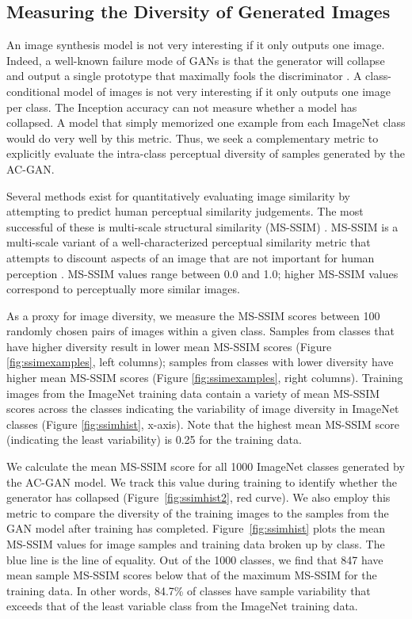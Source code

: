 \documentclass{article}
\begin{document}
\subsection{Measuring the Diversity of Generated Images} \label{section:diversity}

An image synthesis model is not very interesting if it only outputs one image.
Indeed, a well-known failure mode of GANs is that the generator will collapse and
output a single prototype that maximally fools the discriminator \citep{GANS, IMPROVEDTECHNIQUES}.
A class-conditional model of images is not very interesting if it only
outputs one image per class.
The Inception accuracy can not measure whether a model has collapsed.
A model that simply memorized one example from each
ImageNet class would do very well by this metric.
Thus, we seek a complementary metric to explicitly evaluate the intra-class perceptual
diversity of samples generated by the AC-GAN.

Several methods exist for quantitatively evaluating image similarity
by attempting to predict human perceptual similarity judgements.
The most successful 
of these is multi-scale structural similarity (MS-SSIM) \citep{MS-SSIM, MAD}.
MS-SSIM is a multi-scale variant of a well-characterized perceptual similarity metric
that attempts to discount aspects of an image that are not important for human
perception \citep{SSIM}.
MS-SSIM values range between 0.0 and 1.0; higher MS-SSIM values correspond to perceptually more similar
images.

As a proxy for image diversity, we measure the MS-SSIM scores between 100 randomly chosen pairs of images within a given class.
Samples from classes that have higher diversity result in lower mean MS-SSIM scores (Figure \ref{fig:ssimexamples}, left columns); samples from classes with lower diversity have
higher mean MS-SSIM scores (Figure \ref{fig:ssimexamples}, right columns).
Training images from the ImageNet training data contain a variety of mean MS-SSIM scores across the classes indicating the variability of image diversity in ImageNet
classes (Figure \ref{fig:ssimhist}, x-axis).
Note that the highest mean MS-SSIM score (indicating the least variability) is 0.25 for the training data.

We calculate the mean MS-SSIM score for all 1000 ImageNet classes generated by the
AC-GAN model.
We track this value during training to identify whether the generator has collapsed (Figure~\ref{fig:ssimhist2}, red curve).
We also employ this metric to compare the diversity of the training images to
the samples from the GAN model after training has completed.
Figure~\ref{fig:ssimhist} plots the mean MS-SSIM values for image samples and training
data broken up by class.
The blue line is the line of equality.
Out of the 1000 classes, we find that 847 have mean sample MS-SSIM scores below
that of the maximum MS-SSIM for the training data.
In other words, 84.7\% of classes have sample variability that exceeds
that of the least variable class from the ImageNet training data.
\end{document}
